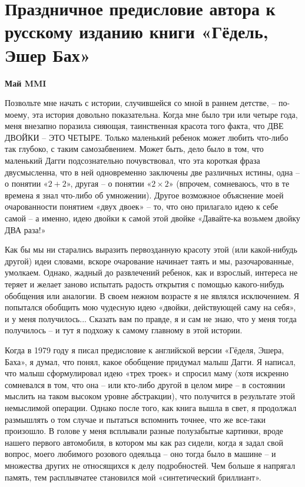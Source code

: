 \documentclass[../main.tex]{subfiles}
\begin{document}
\section[Предисловие]{Праздничное предисловие автора к русскому изданию книги «Гёдель, Эшер Бах»}

\begin{center}
    \textbf{Май MMI}
\end{center}

Позвольте мне начать с истории, случившейся со мной в раннем детстве, \--- по-моему, эта история довольно показательна.
Когда мне было три или четыре года, меня внезапно поразила сияющая, таинственная красота того факта, что ДВЕ ДВОЙКИ \--- ЭТО ЧЕТЫРЕ\@.
Только маленький ребенок может любить что-либо так глубоко, с таким самозабвением.
Может быть, дело было в том, что маленький Дагги подсознательно почувствовал, что эта короткая фраза двусмысленна, что в ней одновременно заключены две различных истины, одна \--- о понятии «$2 + 2$», другая \--- о понятии «$2 \times 2$» (впрочем, сомневаюсь, что в те времена я знал что-либо об умножении).
Другое возможное объяснение моей очарованности понятием «двух двоек» \--- то, что оно прилагало идею к себе самой \--- а именно, идею двойки к самой этой двойке «Давайте-ка возьмем двойку ДВА раза!»

Как бы мы ни старались выразить первозданную красоту этой (или какой-нибудь другой) идеи словами, вскоре очарование начинает таять и мы, разочарованные, умолкаем.
Однако, жадный до развлечений ребенок, как и взрослый, интереса не теряет и желает заново испытать радость открытия с помощью какого-нибудь обобщения или аналогии.
В своем нежном возрасте я не являлся исключением.
Я попытался обобщить мою чудесную идею «двойки, действующей саму на себя», и у меня получилось...
Сказать вам по правде, я и сам не знаю, что у меня тогда получилось \--- и тут я подхожу к самому главному в этой истории.

Когда в 1979 году я писал предисловие к английской версии «Гёделя, Эшера, Баха», я думал, что понял, какое обобщение придумал малыш Дагги.
Я написал, что малыш сформулировал идею «трех троек» и спросил маму (хотя искренно сомневался в том, что она \--- или кто-либо другой в целом мире \--- в состоянии мыслить на таком высоком уровне абстракции), что получится в результате этой немыслимой операции.
Однако после того, как книга вышла в свет, я продолжал размышлять о том случае и пытаться вспомнить точнее, что же все-таки произошло.
В голове у меня всплывали разные полузабытые картинки, вроде нашего первого автомобиля, в котором мы как раз сидели, когда я задал свой вопрос, моего любимого розового одеяльца \--- оно тогда было в машине \--- и множества других не относящихся к делу подробностей.
Чем больше я напрягал память, тем расплывчатее становился мой «синтетический бриллиант».
\end{document}
